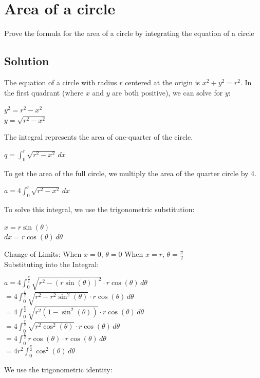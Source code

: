 \documentclass{article}
\begin{document}
\section {Area of a circle}

Prove the formula for the area of a circle by integrating the equation of a circle

\subsection{Solution}
The equation of a circle with radius $r$ centered at the origin is $x^2 + y^2 = r^2$.
In the first quadrant (where $x$ and $y$ are both positive), we can solve for $y$:
\begin{center}
$y^2 = r^2 - x^2$
\\
$y = \sqrt{r^2 - x^2}$
\end{center}
The integral represents the area of one-quarter of the circle.
\begin{center}
$q = \int_0^r \sqrt{r^2 - x^2} \, dx$
\end{center}
To get the area of the full circle, we multiply the area of the quarter circle by 4.
\begin{center}
$a = 4 \int_0^r \sqrt{r^2 - x^2} \, dx$
\end{center}
To solve this integral, we use the trigonometric substitution:
\begin{center}
$x = r \sin(\theta)$
\\
$dx = r \cos(\theta) \, d\theta$
\end{center}
Change of Limits:
When $x = 0$, $\theta = 0$
When $x = r$, $\theta = \frac{\pi}{2}$
\\
Substituting into the Integral:
\begin{center}
$a = 4 \int_0^{\frac{\pi}{2}} \sqrt{r^2 - (r \sin(\theta))^2} \cdot r \cos(\theta) \, d\theta$
\\
$= 4 \int_0^{\frac{\pi}{2}} \sqrt{r^2 - r^2 \sin^2(\theta)} \cdot r \cos(\theta) \, d\theta$
\\
$= 4 \int_0^{\frac{\pi}{2}} \sqrt{r^2 (1 - \sin^2(\theta))} \cdot r \cos(\theta) \, d\theta$
\\
$= 4 \int_0^{\frac{\pi}{2}} \sqrt{r^2 \cos^2(\theta)} \cdot r \cos(\theta) \, d\theta$
\\
$= 4 \int_0^{\frac{\pi}{2}} r \cos(\theta) \cdot r \cos(\theta) \, d\theta$
\\
$= 4r^2 \int_0^{\frac{\pi}{2}} \cos^2(\theta) \, d\theta$
\end{center}
We use the trigonometric identity:
\end{document}
